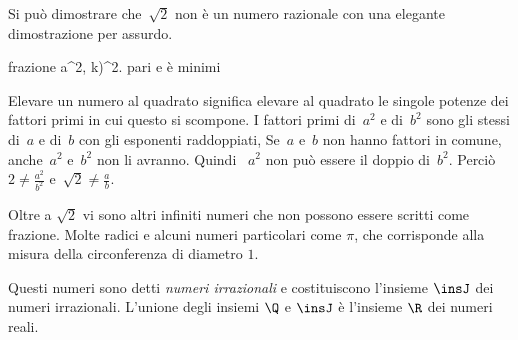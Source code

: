 Si può dimostrare che~\(\sqrt{2}\) non è un numero razionale con una elegante 
dimostrazione per assurdo. 

frazione 
a^2\), 
k)^2\).
pari e 
è
minimi 

Elevare un numero al quadrato significa elevare al quadrato le
singole potenze dei fattori primi in cui questo si scompone. I fattori
primi di~\(a^{2}\) e di~\(b^{2}\) sono gli stessi di~\(a\) e di~\(b\) con
gli esponenti raddoppiati, Se~\(a\) e~\(b\) non hanno fattori in comune, 
anche~\(a^{2}\) e~\(b^{2}\) non li avranno. Quindi ~\(a^{2}\) non può essere 
il 
doppio di~\(b^{2}\).
Perciò~\(2\ne\frac{a^{2}}{b^{2}}\) e~\(\sqrt{2}\ne\frac{a}{b}\).

Oltre a \(\sqrt{2}\) vi sono altri infiniti numeri che non possono essere 
scritti 
come frazione. Molte radici e alcuni numeri particolari come \(\pi\), 
che corrisponde alla misura della circonferenza di diametro \(1\).

Questi numeri sono detti \emph{numeri irrazionali} e costituiscono l'insieme 
\(\insJ\) dei numeri irrazionali.
L'unione degli insiemi \(\Q\) e \(\insJ\) è l'insieme \(\R\) dei numeri 
reali.


